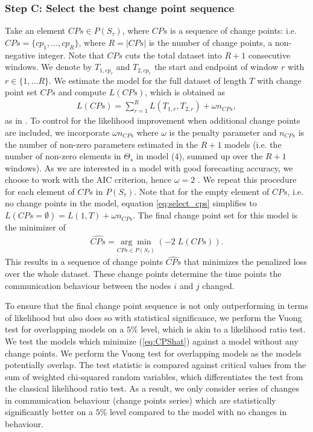 \subsubsection*{Step C: Select the best change point sequence} 
Take an element $CPs \in P(S_{\tau})$, where $CPs$ is a sequence of change points: i.e. $CPs = \{cp_1,\dots,cp_R\}$, where $R=|CPs|$ is the number of change points, a non-negative integer. Note that $CPs$ cuts the total dataset into $R+1$ consecutive windows. We denote by $T_{1,cp_r}$ and $T_{2,cp_r}$ the start and endpoint of window $r$ with $r \in \{1,\dots R\}$. %
We estimate the model for the full dataset of length $T$ with change point set $CPs$ and compute $L(CPs)$, which is obtained as
\begin{align}
	\label{eq:select_cps}
	L(CPs) = \sum_{r = 1}^{R} L(T_{1,r},T_{2,r}) + \omega n_{CPs}, 
\end{align}
as in \textcite{bai2023multiple}. 
To control for the likelihood improvement when additional change points are included, we incorporate $\omega n_{CPs}$ where $\omega$ is the penalty parameter and $n_{CPs}$ is the number of non-zero parameters estimated in the $R+1$ models (i.e. the number of non-zero elements in $\Theta_s$ in model (4), summed up over the $R+1$ windows). As we are interested in a model with good forecasting accuracy, we choose to work with the AIC criterion, hence $\omega = 2$ \citep{Akaike1974}. We repeat this procedure for each element of $CPs$ in $P(S_{\tau})$. Note that for the empty element of $CPs$, i.e. no change points in the model, equation \eqref{eq:select_cps} simplifies to $L(CPs=\emptyset) = L(1,T) + \omega n_{CPs} $. The final change point set for this model is the minimizer of
\begin{align} \label{eq:CPShat}
	\widehat{CPs} = \underset{CPs \in P(S_{\tau})}{\arg \min }\; (-2\;L(CPs)). 
\end{align}
This results in a sequence of change points $\widehat{CPs}$ that minimizes the penalized loss over the whole dataset. These change points determine the time points the communication behaviour between the nodes $i$ and $j$ changed. %

To ensure that the final change point sequence is not only outperforming in terms of likelihood but also does so with statistical significance, we perform the Vuong test for overlapping models \citep{Vuong1989} on a $5\%$ level, which is akin to a likelihood ratio test. We test the models which minimize (\ref{eq:CPShat}) against a model without any change points. We perform the Vuong test for overlapping models as the models potentially overlap. The test statistic is compared against critical values from the sum of weighted chi-squared random variables, which differentiates the test from the classical likelihood ratio test. As a result, we only consider series of changes in communication behaviour (change points series) which are statistically significantly better on a $5\%$ level compared to the model with no changes in behaviour. 

